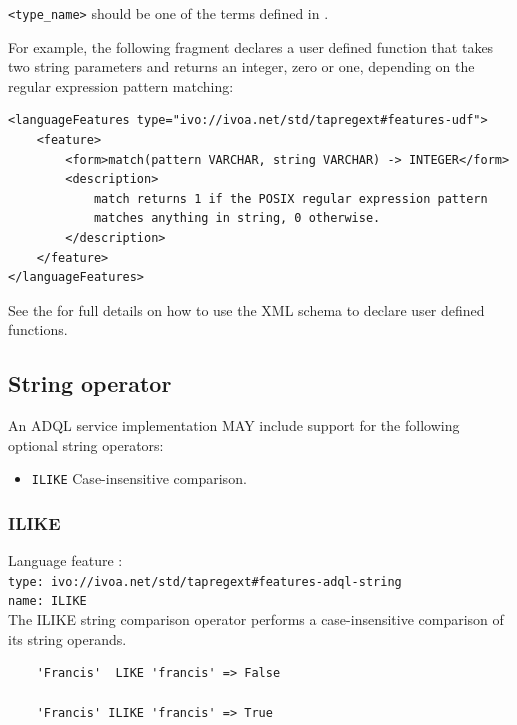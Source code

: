 \documentclass[11pt,a4paper]{ivoa}
\begin{document}
\verb:<type_name>: should be one of the terms defined in .

For example, the following fragment declares a user defined function that
takes two string parameters and returns an integer, zero or one,
depending on the regular expression pattern matching:
\begin{verbatim}
<languageFeatures type="ivo://ivoa.net/std/tapregext#features-udf">
    <feature>
        <form>match(pattern VARCHAR, string VARCHAR) -> INTEGER</form>
        <description>
            match returns 1 if the POSIX regular expression pattern
            matches anything in string, 0 otherwise.
        </description>
    </feature>
</languageFeatures>
\end{verbatim}

See the \TAPRegSpec{} for full details on how to use the
XML schema to declare user defined functions.

\subsection{String operator}
\label{sec:optional.string.functions}

An ADQL service implementation MAY include support for the following optional
string operators:

\begin{itemize}
    \item \verb:ILIKE: Case-insensitive comparison.
\end{itemize}

\subsubsection{ILIKE}
\label{sec:optional.string.functions.ilike}
{\footnotesize Language feature :}\\
{\footnotesize \verb|type: ivo://ivoa.net/std/tapregext#features-adql-string|}\\
{\footnotesize \verb|name: ILIKE|}\\

The ILIKE string comparison operator performs a case-insensitive comparison
of its string operands.

\begin{verbatim}
    'Francis'  LIKE 'francis' => False

    'Francis' ILIKE 'francis' => True
\end{verbatim}

\end{document}
